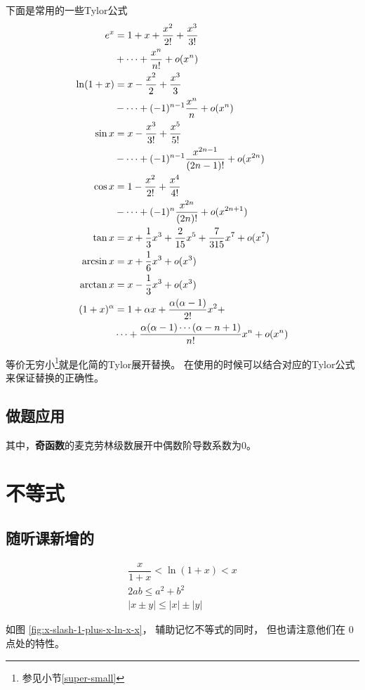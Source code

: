 下面是常用的一些Tylor公式
\begin{align}
    \label{eq:useful-tylor-expandations}
	\notag e^x&=1+x+\frac{x^2}{2!}+\frac{x^3}{3!} \\ &+\cdots+\frac{x^n}{n!}+o(x^n)\\
	\notag \ln(1+x)&=x-\frac{x^2}{2}+\frac{x^3}{3}\\ &-\cdots+(-1)^{n-1}\frac{x^n}{n}+o(x^n)\\
	\notag \sin x&=x-\frac{x^3}{3!}+\frac{x^5}{5!}\\ &-\cdots+(-1)^{n-1}\frac{x^{2n-1}}{(2n-1)!}+o(x^{2n})\\
	\notag \cos x&=1-\frac{x^2}{2!}+\frac{x^4}{4!}\\ &-\cdots+(-1)^n\frac{x^{2n}}{(2n)!}+o(x^{2n+1})\\
           \tan x&=x+\frac{1}{3}x^3 + \frac{2}{15}x^5 + \frac{7}{315}x^7 + o(x^7)\\
           \arcsin x&= x + \frac{1}{6} x^3 + o(x^3) \\
           \arctan x&= x - \frac{1}{3} x^3 + o(x^3) \\
	\notag (1+x)^\alpha&=1+\alpha x+\frac{\alpha(\alpha-1)}{2!}x^2+ \\  &\cdots+\frac{\alpha(\alpha-1)\cdots(\alpha-n+1)}{n!}x^n+o(x^n)
\end{align}

等价无穷小\footnote{参见小节\ref{super-small}}就是化简的Tylor展开替换。
在使用的时候可以结合对应的Tylor公式来保证替换的正确性。

\subsection{做题应用} \label{tylor-app}

其中，\textbf{奇函数}的麦克劳林级数展开中偶数阶导数系数为0。

\section{不等式} \label{inequlity}

\subsection{随听课新增的}

\begin{lemma}
    \begin{gather*}
        \dfrac{x}{1+x} < \ln (1+x) < x \\
        2ab \leq a^2 + b^2 \\
        |x\pm y| \leq |x| \pm |y|
    \end{gather*}
\end{lemma}
如图 \ref{fig:x-slash-1-plus-x-ln-x-x}，
辅助记忆不等式的同时，
但也请注意他们在 $0$ 点处的特性。


